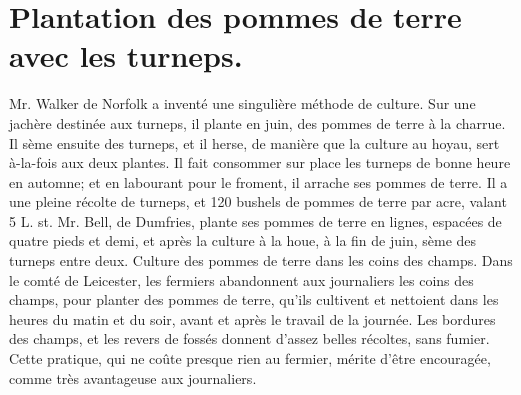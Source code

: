 \section{Plantation des pommes de terre avec les turneps.}
Mr. Walker de Norfolk a inventé une singulière méthode de culture. Sur une jachère destinée aux turneps, il plante en juin, des pommes de terre à la charrue. Il sème ensuite des turneps, et il herse, de manière que la culture au hoyau, sert à-la-fois aux deux plantes. Il fait consommer sur place les turneps de bonne heure en automne; et en labourant pour le froment, il arrache ses pommes de terre. Il a une pleine récolte de turneps, et 120 bushels de pommes de terre par acre, valant 5 L. st.
Mr. Bell, de Dumfries, plante ses pommes de terre en lignes, espacées de quatre pieds et demi, et après la culture à la houe, à la fin de juin, sème des turneps entre deux.\setcounter{page}{275} Culture des pommes de terre dans les coins des champs.
Dans le comté de Leicester, les fermiers abandonnent aux journaliers les coins des champs, pour planter des pommes de terre, qu'ils cultivent et nettoient dans les heures du matin et du soir, avant et après le travail de la journée. Les bordures des champs, et les revers de fossés donnent d'assez belles récoltes, sans fumier. Cette pratique, qui ne coûte presque rien au fermier, mérite d'être encouragée, comme très avantageuse aux journaliers.

